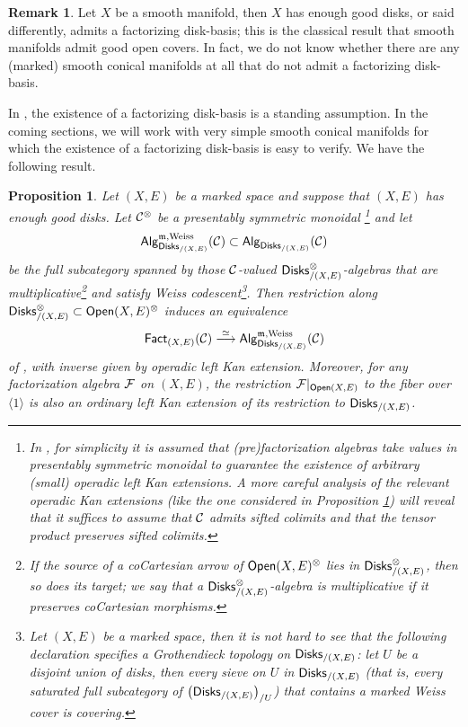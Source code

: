 \documentclass[10pt, reqno, twoside
, final
]{amsart}
\numberwithin{equation}{subsection}%
\theoremstyle{definition}
\theoremstyle{definition}
\theoremstyle{definition}
\theoremstyle{definition}
\theoremstyle{definition}
\theoremstyle{definition}
\theoremstyle{definition}
\theoremstyle{definition}
\theoremstyle{definition}
\theoremstyle{plain}
\theoremstyle{definition}
\theoremstyle{plain}
\theoremstyle{definition}
\theoremstyle{plain}
\theoremstyle{definition}
\newtheorem{rmk}[defn]{Remark}
\theoremstyle{definition}
\theoremstyle{plain}
\theoremstyle{plain}
\theoremstyle{definition}
\theoremstyle{plain}
\theoremstyle{plain}
\newtheorem{prop}[defn]{Proposition}
\theoremstyle{plain}
\begin{document}
\begin{rmk}
Let $X$ be a smooth manifold, then $X$ has enough good disks, or said differently, admits a factorizing disk-basis; this is the classical result that smooth manifolds admit good open covers. In fact, we do not know whether there are any (marked) smooth conical manifolds at all that do not admit a factorizing disk-basis.    
\end{rmk}
In \cite{KSW,KS}, the existence of a factorizing disk-basis is a standing assumption. In the coming sections, we will work with very simple smooth conical manifolds for which the existence of a factorizing disk-basis is easy to verify. We have the following result.
\begin{prop}\label{prop:restricttodisks}
Let $(X,E)$ be a marked space and suppose that $(X,E)$ has enough good disks. Let $\mathcal{C}^{\otimes}$ be a presentably symmetric monoidal \infcat\footnote{In \cite{KSW,KS}, for simplicity it is assumed that (pre)factorization algebras take values in presentably symmetric monoidal \infcats to guarantee the existence of arbitrary (small) operadic left Kan extensions. A more careful analysis of the relevant operadic Kan extensions (like the one considered in Proposition \ref{prop:restricttodisks}) will reveal that it suffices to assume that $\mathcal{C}$ admits sifted colimits and that the tensor product preserves sifted colimits.} and let 
\[\mathsf{Alg}^{\mathfrak{m},\mathrm{Weiss}}_{\mathsf{Disks}_{/(X,E)}}(\mathcal{C})\subset \mathsf{Alg}_{\mathsf{Disks}_{/(X,E)}}(\mathcal{C})\]
be the full subcategory spanned by those $\mathcal{C}$-valued $\mathsf{Disks}_{/(X,E)}^{\otimes}$-algebras that are multiplicative\footnote{If the source of a coCartesian arrow of $\mathsf{Open}(X,E)^{\otimes}$ lies in $\mathsf{Disks}_{/(X,E)}^{\otimes}$, then so does its target; we say that a $\mathsf{Disks}_{/(X,E)}^{\otimes}$-algebra is multiplicative if it preserves coCartesian morphisms.} and satisfy Weiss codescent\footnote{Let $(X,E)$ be a marked space, then it is not hard to see that the following declaration specifies a Grothendieck topology on $\mathsf{Disks}_{/(X,E)}$: let $U$ be a disjoint union of disks, then every sieve on $U$ in $\mathsf{Disks}_{/(X,E)}$ (that is, every saturated full subcategory of $\left(\mathsf{Disks}_{/(X,E)}\right)_{/U}$) that contains a marked Weiss cover is covering.}. Then restriction along $\mathsf{Disks}_{/(X,E)}^{\otimes}\subset \mathsf{Open}(X,E)^{\otimes}$ induces an equivalence
\begin{equation}\label{eq:restricttodisks}
\mathsf{Fact}_{(X,E)}(\mathcal{C}) \overset{\simeq}{\longrightarrow} \mathsf{Alg}^{\mathfrak{m},\mathrm{Weiss}}_{\mathsf{Disks}_{/(X,E)}}(\mathcal{C})
\end{equation}
of \infcatst, with inverse given by operadic left Kan extension. Moreover, for any factorization algebra $\mathcal{F}$ on $(X,E)$, the restriction $\mathcal{F}|_{\mathsf{Open}(X,E)}$ to the fiber over $\langle 1\rangle$ is also an \emph{ordinary} left Kan extension of its restriction to $\mathsf{Disks}_{/(X,E)}$. 
\end{prop}
\end{document}
